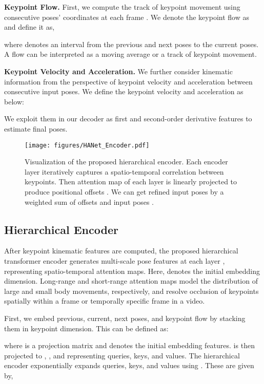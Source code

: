 \documentclass[10pt,twocolumn,letterpaper]{article}
\begin{document}
\textbf{Keypoint Flow.} First, we compute the track of keypoint movement using consecutive poses' coordinates  at each frame . 
We denote the keypoint flow as  and define it as,


where  denotes an interval from the previous and next poses to the current poses. A flow  can be interpreted as a moving average or a track of keypoint movement. 

\textbf{Keypoint Velocity and Acceleration.} We further consider kinematic information from the perspective of keypoint velocity and acceleration between consecutive input poses. We define the keypoint velocity and acceleration as below:

We exploit them in our decoder as first and second-order derivative features to estimate final poses.

\begin{figure}[t]
\centering
\texttt{[image: figures/HANet\_Encoder.pdf]}
\caption{Visualization of the proposed hierarchical encoder. Each encoder layer iteratively captures a spatio-temporal correlation between keypoints. Then attention map of each layer is linearly projected to produce positional offsets . We can get refined input poses  by a weighted sum of offsets  and input poses .}
\label{fig:hierarchical encoder}
\end{figure}

\subsection{Hierarchical Encoder}

After keypoint kinematic features are computed, the proposed hierarchical transformer encoder generates multi-scale pose features  at each layer , representing spatio-temporal attention maps. Here,  denotes the initial embedding dimension. Long-range and short-range attention maps model the distribution of large and small body movements, respectively, and resolve occlusion of keypoints spatially within a frame or temporally specific frame in a video.

First, we embed previous, current, next poses, and keypoint flow  by stacking them in keypoint dimension. This can be defined as:

where  is a projection matrix and  denotes the initial embedding features.  is then projected to , , and  representing queries, keys, and values. The hierarchical encoder exponentially expands queries, keys, and values using . These are given by,
\end{document}
